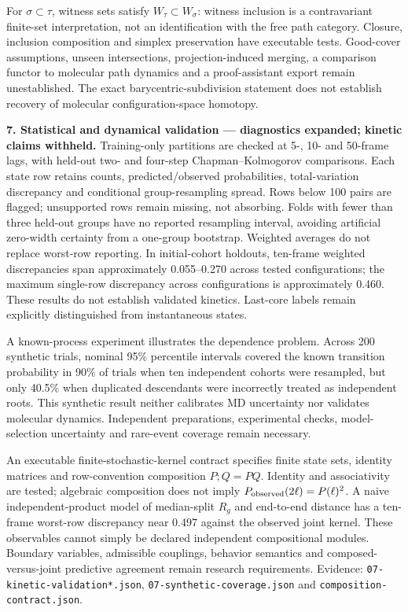 \documentclass[11pt]{article}
\begin{document}
For $\sigma\subset\tau$, witness sets satisfy $W_\tau\subset W_\sigma$:
witness inclusion is a contravariant finite-set interpretation, not an
identification with the free path category. Closure, inclusion composition
and simplex preservation have executable tests. Good-cover assumptions,
unseen intersections, projection-induced merging, a comparison functor to
molecular path dynamics and a proof-assistant export remain unestablished.
The exact barycentric-subdivision statement does not establish recovery
of molecular configuration-space homotopy.

\textbf{7. Statistical and dynamical validation --- diagnostics expanded; kinetic claims withheld.}
Training-only partitions are checked at 5-, 10- and 50-frame lags, with
held-out two- and four-step Chapman--Kolmogorov comparisons. Each state row
retains counts, predicted/observed probabilities, total-variation discrepancy
and conditional group-resampling spread. Rows below 100 pairs are flagged;
unsupported rows remain missing, not absorbing. Folds with fewer than three
held-out groups have no reported resampling interval, avoiding artificial
zero-width certainty from a one-group bootstrap. Weighted averages do not
replace worst-row reporting. In initial-cohort holdouts, ten-frame weighted
discrepancies span approximately 0.055--0.270 across tested configurations;
the maximum single-row discrepancy across configurations is approximately
0.460. These results do not establish validated kinetics. Last-core labels
remain explicitly distinguished from instantaneous states.

A known-process experiment illustrates the dependence problem. Across 200
synthetic trials, nominal 95\% percentile intervals covered the known transition
probability in 90\% of trials when ten independent cohorts were resampled,
but only 40.5\% when duplicated descendants were incorrectly treated as
independent roots. This synthetic result neither calibrates MD uncertainty
nor validates molecular dynamics. Independent preparations, experimental
checks, model-selection uncertainty and rare-event coverage remain necessary.

An executable finite-stochastic-kernel contract specifies finite state sets,
identity matrices and row-convention composition $P;Q=PQ$. Identity and
associativity are tested; algebraic composition does not imply
$P_{\rm observed}(2\ell)=P(\ell)^2$. A naive independent-product model of
median-split $R_g$ and end-to-end distance has a ten-frame worst-row discrepancy
near 0.497 against the observed joint kernel. These observables cannot simply
be declared independent compositional modules. Boundary variables, admissible
couplings, behavior semantics and composed-versus-joint predictive agreement
remain research requirements. Evidence: \texttt{07-kinetic-validation*.json},
\texttt{07-synthetic-coverage.json} and \texttt{composition-contract.json}.
\end{document}
